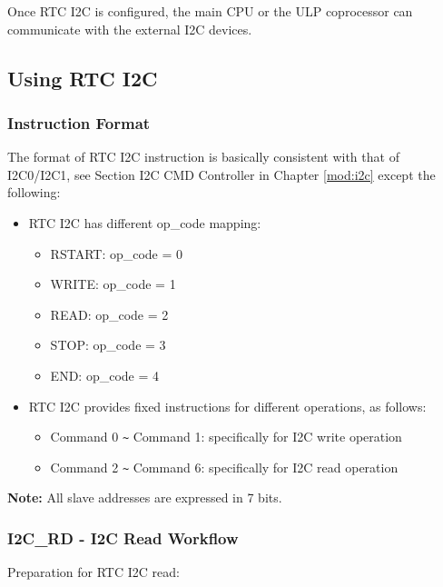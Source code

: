 \documentclass[main\_\_EN.tex]{subfiles}
\begin{document}
Once RTC I2C is configured, the main CPU or the ULP coprocessor can communicate with the external I2C devices.

\subsection{Using RTC I2C}
\subsubsection{Instruction Format}

The format of RTC I2C instruction is basically consistent with that of I2C0/I2C1, see Section I2C CMD Controller 
in Chapter \ref{mod:i2c} \textit{} except the following:
\begin{itemize}
    \item RTC I2C has different op\_code mapping:
    \begin{itemize}
        \item RSTART: op\_code = 0
        \item WRITE: op\_code = 1
        \item READ: op\_code = 2
        \item STOP: op\_code = 3
        \item END: op\_code = 4
    \end{itemize}
    \item RTC I2C provides fixed instructions for different operations, as follows:
    \begin{itemize}
        \item Command 0 \verb+~+ Command 1: specifically for I2C write operation
        \item Command 2 \verb+~+ Command 6: specifically for I2C read operation
    \end{itemize}
\end{itemize}

\textbf{Note:}
All slave addresses are expressed in 7 bits.


\subsubsection{I2C\_RD - I2C Read Workflow}

Preparation for RTC I2C read:
\end{document}
